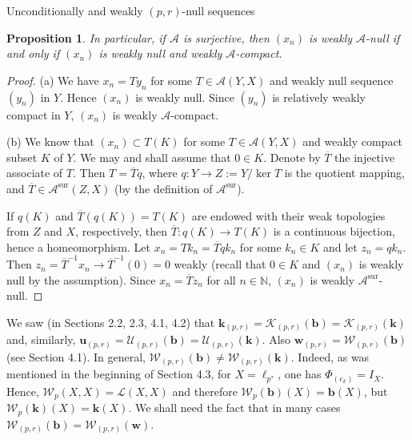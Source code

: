 \documentclass[a4paper,11pt]{amsart}
\newtheorem{prop}{Proposition}[section]
\theoremstyle{definition}
\theoremstyle{definition}
\theoremstyle{definition}
\begin{document}
\begin{section}{Unconditionally and weakly ${{(p,r)}}$-null sequences}
\begin{prop}
In particular, if ${{\mathcal A}}$ is surjective, then $(x_n)$ is weakly ${{\mathcal A}}$-null if and only if $(x_n)$ is weakly null and weakly ${{\mathcal A}}$-compact.
\end{prop}

\begin{proof}
(a) We have $x_n= Ty_n$ for some $T \in {{\mathcal A}}(Y,X)$ and weakly null sequence $(y_n)$ in $Y$. Hence $(x_n)$ is weakly null. Since $(y_n)$ is relatively weakly compact in $Y$, $(x_n)$ is weakly ${{\mathcal A}}$-compact.

(b) We know that $(x_n)\subset T(K)$ for some $T\in {{\mathcal A}}(Y,X)$ and weakly compact subset $K$ of $Y$. We may and shall assume that $0 \in K$. Denote by $\overline T$ the injective associate of $T$. Then $T=\overline T q$, where $q: Y{\rightarrow} Z:=Y/\ker T$ is the quotient mapping, and $\overline T \in {{\mathcal A}}^\mathrm{sur}(Z, X)$ (by the definition of ${{\mathcal A}}^\mathrm{sur}$). 

If $q(K)$ and $\overline T(q(K))=T(K)$ are endowed with their weak topologies from $Z$ and $X$, respectively, then $\overline T: q(K){\rightarrow} T(K)$ is a continuous bijection, hence a homeomorphism. Let $x_n=Tk_n=\overline Tqk_n$ for some $k_n\in K$ and let $z_n=qk_n$. Then $z_n=\overline T ^{-1}x_n {\rightarrow} \overline T^{-1}(0)=0$ weakly (recall that $0\in K$ and $(x_n)$ is weakly null by the assumption). Since $x_n=\overline T z_n$ for all $n\in {{\mathbb N}}$, $(x_n)$ is weakly ${{\mathcal A}}^\mathrm{sur}$-null.
\end{proof}

We saw (in Sections 2.2, 2.3, 4.1, 4.2) that ${\boldsymbol{k}} _{{(p,r)}} = {{\mathcal K}}_{{(p,r)}} ({\boldsymbol{b}})= {{\mathcal K}}_{{(p,r)}} ({\boldsymbol{k}})$ and, similarly, ${\boldsymbol{u}} _{{(p,r)}} = {{\mathcal U}}_{{(p,r)}} ({\boldsymbol{b}}) = {{\mathcal U}}_{{(p,r)}} ({\boldsymbol{k}})$. Also ${\boldsymbol{w}}_{{(p,r)}} ={{\mathcal W}}_{{(p,r)}} ({\boldsymbol{b}})$ (see Section 4.1). In general, ${{\mathcal W}}_{{(p,r)}} ({\boldsymbol{b}}) \neq {{\mathcal W}}_{{(p,r)}} ({\boldsymbol{k}})$. Indeed, as was mentioned in the beginning of Section 4.3, for $X=\ell_{p^{\ast}}$, one has $\Phi _{(e_k)}=I_X$. Hence, ${{\mathcal W}}_p(X,X)={{\mathcal L}}(X,X)$ and therefore ${{\mathcal W}}_p({\boldsymbol{b}})(X)={\boldsymbol{b}}(X)$, but ${{\mathcal W}}_p({\boldsymbol{k}})(X)={\boldsymbol{k}}(X)$. We shall need the fact that in many cases ${{\mathcal W}} _{{(p,r)}} ({\boldsymbol{b}})= {{\mathcal W}}_{{(p,r)}} ({\boldsymbol{w}})$.


\end{section}
\end{document}
